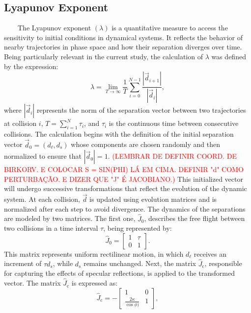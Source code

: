 \documentclass[pdflatex,sn-mathphys-num,iicol]{sn-jnl}%
\theoremstyle{thmstyleone}%
\theoremstyle{thmstyletwo}%
\theoremstyle{thmstylethree}%
\begin{document}
\subsection{\label{subsec:lyap} Lyapunov Exponent}

\ \ \ \ The Lyapunov exponent $(\lambda)$ is a quantitative measure to access the sensitivity to initial conditions in dynamical systems. It reflects the behavior of nearby trajectories in phase space and how their separation diverges over time. Being particularly relevant in the current study, the calculation of $\lambda$ was defined by the expression:
%
\begin{equation}
\label{eq:lyapdef}
\lambda = \lim_{T \rightarrow \infty}\frac{1}{T}\sum_{i=0}^{N-1} \frac{\left | \vec{d}_{i+1} \right |}{\left | \vec{d}_i \right |},
\end{equation}
%
where $\left | \vec{d}_i \right |$ represents the norm of the separation vector between two trajectories at collision $i$, $T = \sum_{i=1}^{N} \tau_i$, and $\tau_i$ is the continuous time between consecutive collisions. The calculation begins with the definition of the initial separation vector $\vec{d}_0 = (d_\ell, d_s)$ whose components are chosen randomly and then normalized to ensure that $\left | \vec{d}_0 \right | = 1$. \textcolor{red}{(LEMBRAR DE DEFINIR COORD. DE BIRKORV. E COLOCAR S = SIN(PHI) LÁ EM CIMA. DEFINIR "d" COMO PERTURBAÇÃO. E DIZER QUE "J" É JACOBIANO.)} This initialized vector will undergo successive transformations that reflect the evolution of the dynamic system. At each collision, $\vec{d}$ is updated using evolution matrices and is normalized after each step to avoid divergence. The dynamics of the separations are modeled by two matrices. The first one, $\hat{J}_0$, describes the free flight between two collisions in a time interval $\tau$, being represented by:
%
\begin{equation}
\label{eq:J0}
\hat{J}_0 = 
\begin{bmatrix}
1 & \tau \\
0 & 1
\end{bmatrix}.
\end{equation}
%
This matrix represents uniform rectilinear motion, in which $d_\ell$ receives an increment of $\tau d_s$, while $d_s$ remains unchanged. Next, the matrix $\hat{J}_\text{c}$, responsible for capturing the effects of specular reflections, is applied to the transformed vector. The matrix $\hat{J}_\text{c}$ is expressed as:
%
\begin{equation}
\label{eq:Jc}
\hat{J}_\text{c} = -\begin{bmatrix}
1 & 0 \\
\frac{2 \kappa}{\cos \phi)} & 1
\end{bmatrix},
\end{equation}
\end{document}
